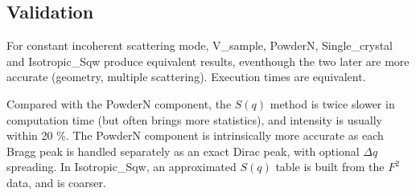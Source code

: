 \subsection{Validation}
For constant incoherent scattering mode, V\_sample, PowderN, Single\_crystal and Isotropic\_Sqw produce equivalent results, eventhough the two later are more accurate (geometry, multiple scattering). Execution times are equivalent.

Compared with the PowderN component, the $S(q)$ method is twice slower in computation time (but often brings more statistics), and intensity is usually within 20 \%. The PowderN component is intrinsically more accurate as each Bragg peak is handled separately as an exact Dirac peak, with optional $\Delta q$ spreading. In Isotropic\_Sqw, an approximated $S(q)$ table is built from the $F^2$ data, and is coarser.



